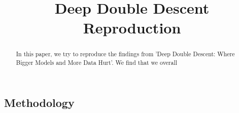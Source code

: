 \documentclass{article}
\title{Deep Double Descent Reproduction}
\begin{document}
\onecolumn
\maketitle



\begin{abstract}
In this paper, we try to reproduce the findings from 'Deep Double Descent: Where Bigger Models and More Data Hurt'. We find that we overall


\end{abstract}


\subsection{Methodology}
\end{document}
